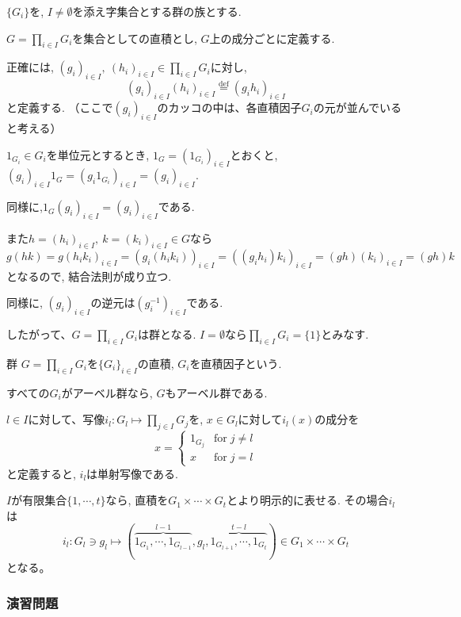 $\{G_i\}$を, $I\neq \emptyset$を添え字集合とする群の族とする.

$ G=\prod_{i \in I}G_i$を集合としての直積とし, $G$上の成分ごとに定義する.

正確には, $(g_i)_{i\in I},\: (h_i)_{i\in I} \in \prod_{i \in I}G_i$に対し,
\[
 (g_i)_{i \in I}(h_i)_{i \in I} \overset{\mathrm{def}}{=} 
 (g_i h_i)_{i \in I}
 \]
と定義する.
（ここで$(g_i)_{i \in I}$のカッコの中は、各直積因子$G_i$の元が並んでいると考える）

$1_{G_i} \in G_i $を単位元とするとき, $1_G = (1_{G_i})_{i \in I}$とおくと,
$ (g_i)_{i \in I}1_G = (g_i 1_{G_i})_{i \in I} = (g_i)_{i \in I}$.

同様に,$1_G (g_i)_{i\in I} = (g_i)_{i \in I}$である.

また$h=(h_i)_{i \in I},\: k=(k_i)_{i \in I} \in G $なら
\[
g(hk) = g(h_i k_i)_{i \in I} = (g_i(h_i k_i))_{i \in I}
 =((g_i h_i) k_i)_{i \in I}=(gh)(k_i)_{i \in I}=(gh)k
\]
となるので, 結合法則が成り立つ.

同様に, $(g_i)_{i \in I}$の逆元は$(g_i^{-1})_{i \in I}$である.

したがって、$G=\prod_{i \in I}G_i$は群となる.
$I=\emptyset$なら$\prod_{i \in I}G_i=\{1\}$とみなす.

\begin{dfn*}
	群 $G=\prod_{i \in I}G_i$を$\{G_i\}_{i \in I}$の直積,
	$G_i$を直積因子という.
\end{dfn*}

すべての$G_i$がアーベル群なら, $G$もアーベル群である.\newline

$l \in I$に対して、写像$i_l: G_l \mapsto \prod_{j \in I}G_j$を,
$x \in G_l$に対して$i_l(x)$の成分を
\[x= \begin{cases} 1_{G_j} & \text{for} \; j \neq l \\ 
  x & \text{for}\; j=l \end{cases}\]
と定義すると, $i_l$は単射写像である.

$I$が有限集合$\{1,\cdots,t\}$なら, 
直積を$G_1 \times \cdots \times G_t$とより明示的に表せる. その場合$i_l$は
\[
i_l: G_l \ni g_l \mapsto 
(\overset{l-1}{\overbrace{1_{G_1},\cdots,1_{G_{l-1}}}},g_l, \overset{t-l}{\overbrace{1_{G_{l+1}},\cdots,1_{G_t}}} )
 \in G_1 \times \cdots \times G_t 
\]
となる。\\

\subsubsection*{演習問題}

